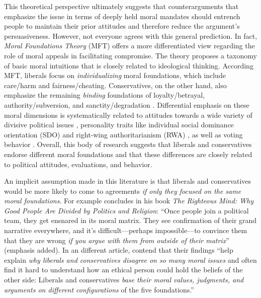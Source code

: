 This theoretical perspective ultimately suggests that counterarguments that emphasize the issue in terms of deeply held moral mandates should entrench people to maintain their prior attitudes and therefore reduce the argument's persuasiveness. However, not everyone agrees with this general prediction. In fact, \textit{Moral Foundations Theory} (MFT) offers a more differentiated view regarding the role of moral appeals in facilitating compromise. The theory proposes a taxonomy of basic moral intuitions that is closely related to ideological thinking. According MFT, liberals focus on \emph{individualizing} moral foundations, which include care/harm and fairness/cheating. Conservatives, on the other hand, also emphasize the remaining \emph{binding} foundations of loyalty/betrayal, authority/subversion, and sanctity/degradation \citep{haidt2007morality, graham2009liberals}. Differential emphasis on these moral dimensions is systematically related to attitudes towards a wide variety of divisive political issues \citep[e.g.][]{koleva2012tracing, kertzer2014moral, low2015moral}, personality traits like individual social dominance orientation (SDO) and right-wing authoritarianism (RWA) \citep{federico2013mapping}, as well as voting behavior \citep{franks2015using}. Overall, this body of research suggests that liberals and conservatives endorse different moral foundations and that these differences are closely related to political attitudes, evaluations, and behavior.

An implicit assumption made in this literature is that liberals and conservatives would be more likely to come to agreements \emph{if only they focused on the same moral foundations}. For example \citet[365]{haidt2012righteous} concludes in his book \emph{The Righteous Mind: Why Good People Are Divided by Politics and Religion}: ``Once people join a political team, they get ensnared in its moral matrix. They see confirmation of their grand
narrative everywhere, and it's difficult---perhaps impossible---to convince them that they are wrong \emph{if you argue with them from outside of their matrix}'' (emphasis added). In an different article, \citet[1040]{graham2009liberals} contend that their findings ``help explain \emph{why liberals and conservatives disagree on so many moral issues} and often find it hard to understand how an ethical person could hold the beliefs of the other side: Liberals and conservatives \emph{base their moral values, judgments, and arguments on different configurations} of the five foundations.'' 

